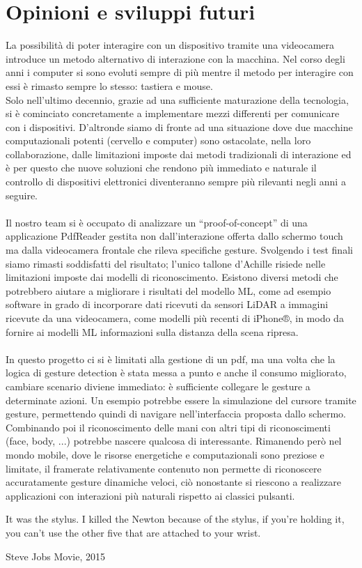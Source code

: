 \section{Opinioni e sviluppi futuri}
La possibilità di poter interagire con un dispositivo tramite una videocamera introduce un metodo alternativo di interazione con la macchina. Nel corso degli anni i computer si sono evoluti sempre di più mentre il metodo per interagire con essi è rimasto sempre lo stesso: tastiera e mouse.\\
Solo nell'ultimo decennio, grazie ad una sufficiente maturazione della tecnologia, si è cominciato concretamente a implementare mezzi differenti per comunicare con i dispositivi. D'altronde siamo di fronte ad una situazione dove due macchine computazionali potenti (cervello e computer) sono ostacolate, nella loro collaborazione, dalle limitazioni imposte dai metodi tradizionali di interazione ed è per questo che nuove soluzioni che rendono più immediato e naturale il controllo di dispositivi elettronici diventeranno sempre più rilevanti negli anni a seguire.\\
\\
\noindent Il nostro team si è occupato di analizzare un “proof-of-concept” di una applicazione PdfReader gestita non dall'interazione offerta dallo schermo touch ma dalla videocamera frontale che rileva specifiche gesture. Svolgendo i test finali siamo rimasti soddisfatti del risultato; l'unico tallone d'Achille risiede nelle limitazioni imposte dai modelli di riconoscimento.
Esistono diversi metodi che potrebbero aiutare a migliorare i risultati del modello ML, come ad esempio software in grado di incorporare dati ricevuti da sensori LiDAR a immagini ricevute da una videocamera, come modelli più recenti di iPhone®, in modo da fornire ai modelli ML informazioni sulla distanza della scena ripresa.\\
\\
\noindent In questo progetto ci si è limitati alla gestione di un pdf, ma una volta che la logica di gesture detection è stata messa a punto e anche il consumo migliorato, cambiare scenario diviene immediato: è sufficiente collegare le gesture a determinate azioni. Un esempio potrebbe essere la simulazione del cursore tramite gesture, permettendo quindi di navigare nell'interfaccia proposta dallo schermo. Combinando poi il riconoscimento delle mani con altri tipi di riconoscimenti (face, body, ...) potrebbe nascere qualcosa di interessante. Rimanendo però nel mondo mobile, dove le risorse energetiche e computazionali sono preziose e limitate, il framerate relativamente contenuto non permette di riconoscere accuratamente gesture dinamiche veloci, ciò nonostante si riescono a realizzare applicazioni con interazioni più naturali rispetto ai classici pulsanti.


\epigraph{It was the stylus. I killed the Newton because of the stylus, if you're holding it, you can't use the other five that are attached to your wrist.}{Steve Jobs Movie, 2015}
